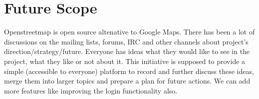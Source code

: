 
\section{Future Scope}
Openstreetmap is open source altenative to Google Maps.
There has been a lot of discussions on the mailing lists, forums, IRC and other channels about project's direction/strategy/future. Everyone has ideas what they would like to see in the project, what they like or not about it. This initiative is supposed to provide a simple (accessible to everyone) platform to record and further discuss these ideas, merge them into larger topics and prepare a plan for future actions.
We can add more features like improving the login functionality also.

